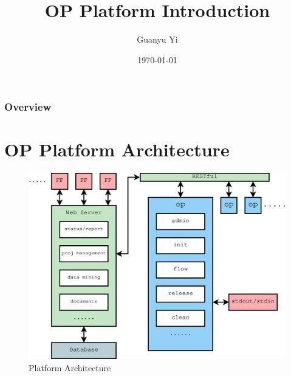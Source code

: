 \documentclass{beamer}
\title[OP platform introduction]{OP Platform Introduction} %
\author{Guanyu Yi} %
\institute[Alchip] %
{
  OP Team, Alchip, Inc. \\ %
  \medskip
  \textit{guanyu\_yi@alchip.com} %
}
\date{\today} %
\begin{document}
\begin{frame}
  \titlepage %
\end{frame}

\begin{frame}
  \frametitle{Overview} %
  \tableofcontents %
\end{frame}


\section{OP Platform Architecture} %

\begin{frame}
  \begin{figure}
    \centering
    \includegraphics[width=0.98\linewidth]{pp_struc}
    \caption{Platform Architecture}
  \end{figure}
\end{frame}
\end{document}
